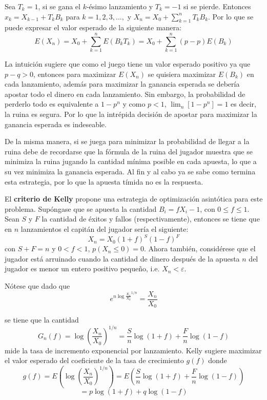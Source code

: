 Sea $T_k = 1$, si se gana el $k$-ésimo lanzamiento y $T_k = -1$ si se pierde. Entonces $x_k = X_{k-1} + T_k B_k$ para $k=1,2,3, ...,$ y $X_n = X_0 + \sum_{k=1}^{n}{T_k B_k}$. Por lo que se puede expresar el valor esperado de la siguiente manera:
\[E(X_n) = X_0 + \sum_{k=1}^{n}{E(B_k T_k)} = X_0 + \sum_{k=1}^{n}{(p-p)E(B_k)}\]
 
La intuición sugiere que como el juego tiene un valor esperado positivo ya que $p - q > 0$, entonces para maximizar $E(X_n)$ se quisiera maximizar $E(B_k)$ en cada lanzamiento, además para maximizar la ganancia esperada se debería apostar todo el dinero en cada lanzamiento. Sin embargo, la probabilidad de perderlo todo es equivalente a $1 - p^n$ y como $p < 1$, $\lim_n[1 - p^n] = 1$ es decir, la ruina es segura. Por lo que la intrépida decisión de apostar para maximizar la ganancia esperada es indeseable.

De la misma manera, si se juega para minimizar la probabilidad de llegar a la ruina debe de recordarse que la fórmula de la ruina del jugador muestra que se minimiza la ruina jugando la cantidad mínima posible en cada apuesta, lo que a su vez minimiza la ganancia esperada. Al fin y al cabo ya se sabe como termina esta estrategia, por lo que la apuesta tímida no es la respuesta.

El \textbf{criterio de Kelly} \cite{kelly1956new} propone una estrategia de optimización asintótica para este problema. Supóngase que se apuesta la cantidad $B_i = fX_i-1$, con $0 \leqslant f \leqslant 1$. Sean $S$ y $F$ la cantidad de éxitos y fallos (respectivamente), entonces se tiene que en $n$ lanzamientos el capitán del jugador sería el siguiente:
\[X_n = X_0(1+f)^S(1-f)^F\] con $S + F = n$ y $0<f<1$, $p(X_n \leqslant 0) = 0 $. 
Ahora también, considérese que el jugador está arruinado cuando la cantidad de dinero después de la apuesta $n$ del jugador es menor un entero positivo pequeño, i.e. $X_n < \varepsilon$.

Nótese que dado que
\[e^{n \log{\frac{X_n}{X_0}^{1/n}}} = \frac{X_n}{X_0}\]

se tiene que la cantidad
\[G_n(f) = \log{\left(\frac{X_n}{X_0}\right)^{1/n}} = \frac{S}{n}\log(1+f) + \frac{F}{n}\log(1-f)\]
mide la tasa de incremento exponencial por lanzamiento. Kelly sugiere maximizar el valor esperado del coeficiente de la tasa de crecimiento $g(f)$ donde
\[g(f) = E\left(\log\left(\frac{X_n}{X_0}\right)^{1/n}\right) = E\left({\frac{S}{n}\log(1+f) + \frac{F}{n}\log(1-f)}\right)\]
\[=p\log(1+f)+q\log(1-f)\]

